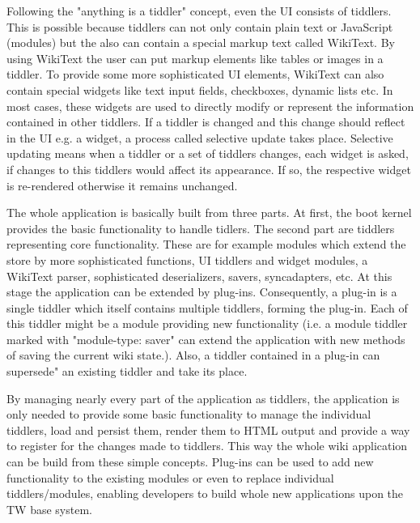 \documentclass[12pt,a4paper]{article}
\newcommand{\todo}[1]{{\bf TODO: #1}\\
}
\begin{document}
Following the "anything is a tiddler" concept, even the UI consists of tiddlers.
This is possible because tiddlers can not only contain plain text or JavaScript (modules) but the also can contain a special markup text called WikiText.
By using WikiText the user can put markup elements like tables or images in a tiddler.
To provide some more sophisticated UI elements, WikiText can also contain special widgets like text input fields,
checkboxes, dynamic lists etc.
In most cases, these widgets are used to directly modify or represent the information contained in other tiddlers.
If a tiddler is changed and this change should reflect in the UI e.g. a widget, a process called selective update takes place. Selective updating means when a tiddler or a set of tiddlers changes, each widget is asked, if changes to this tiddlers would affect its appearance. If so, the respective widget is re-rendered otherwise it remains unchanged.

The whole application is basically built from three parts. At first, the boot kernel provides the basic functionality to handle tidlers. The second part are tiddlers representing core functionality. These are for example modules which extend the store by more sophisticated functions, UI tiddlers and widget modules, a WikiText parser, sophisticated deserializers, savers, syncadapters, etc.
At this stage the application can be extended by plug-ins. Consequently, a plug-in is a single tiddler which itself contains multiple tiddlers, forming the plug-in. Each of this tiddler might be a module providing new functionality (i.e. a module tiddler marked with "module-type: saver" can extend the application with new methods of saving the current wiki state.).
Also, a tiddler contained in a plug-in can supersede" an existing tiddler and take its place.

By managing nearly every part of the application as tiddlers, the application is only needed to provide some basic functionality to manage the individual tiddlers, load and persist them, render them to HTML output and provide a way to register for the changes made to tiddlers.
This way the whole wiki application can be build from these simple concepts.
Plug-ins can be used to add new functionality to the existing modules or even to replace individual tiddlers/modules,
enabling developers to build whole new applications upon the TW base system.
\end{document}
